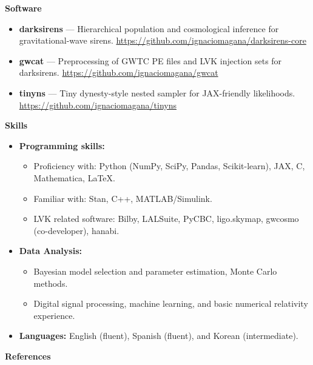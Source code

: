 \documentclass[letterpaper,10pt]{article}
\newcommand{\resheading}[1]{{\large \colorbox{mygrey}{\begin{minipage}{\dimexpr\textwidth-2\fboxsep\relax}{\textbf{#1 \vphantom{p\^{E}}}}\end{minipage}}}}
\begin{document}
\resheading{Software}
\begin{itemize}
\item \textbf{darksirens} --- Hierarchical population and cosmological inference for gravitational-wave sirens. \url{https://github.com/ignaciomagana/darksirens-core}
\item \textbf{gwcat} --- Preprocessing of GWTC PE files and LVK injection sets for darksirens. \url{https://github.com/ignaciomagana/gwcat}
\item \textbf{tinyns} --- Tiny dynesty-style nested sampler for JAX-friendly likelihoods. \url{https://github.com/ignaciomagana/tinyns}
\end{itemize}

\resheading{Skills}
\begin{itemize}
\item \textbf{Programming skills:}
	\begin{itemize}
	\item Proficiency with: Python (NumPy, SciPy, Pandas, Scikit-learn), JAX, C, Mathematica, LaTeX.
	\item Familiar with: Stan, C++, MATLAB/Simulink.
	\item LVK related software: Bilby, LALSuite, PyCBC, ligo.skymap, gwcosmo (co-developer), hanabi.
	\end{itemize}
\item \textbf{Data Analysis:}
	\begin{itemize}
		\item Bayesian model selection and parameter estimation, Monte Carlo methods.
		\item Digital signal processing, machine learning, and basic numerical relativity experience.
	\end{itemize}
\item \textbf{Languages:} English (fluent), Spanish (fluent), and Korean (intermediate). %
\end{itemize}


\resheading{References}
\end{document}
